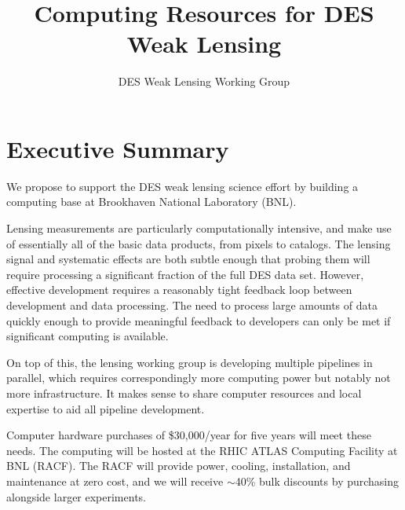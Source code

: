 \documentclass[12pt]{article}
\begin{document}
\title{Computing Resources for DES Weak Lensing}
\author{DES Weak Lensing Working Group}

\date{}
\maketitle


\section{Executive Summary}

We propose to support the DES weak lensing science effort by building a
computing base at Brookhaven National Laboratory (BNL).  

Lensing measurements are particularly computationally intensive, and make use
of essentially all of the basic data products, from pixels to catalogs.  The
lensing signal and systematic effects are both subtle enough that probing them
will require processing a significant fraction of the full DES data set.
However, effective development requires a reasonably tight feedback loop
between development and data processing.  The need to process large amounts
of data quickly enough to provide meaningful feedback to developers 
can only be met if significant computing is available.

On top of this, the lensing working group is developing multiple pipelines in
parallel, which requires correspondingly more computing power but notably not
more infrastructure.  It makes sense to share computer resources and local
expertise to aid all pipeline development.

Computer hardware purchases of \$30,000/year for five years will meet these
needs.  The computing will be hosted at the RHIC ATLAS Computing Facility at
BNL (RACF).  The RACF will provide power, cooling, installation, and
maintenance at zero cost, and we will receive $\sim$40\% bulk discounts by
purchasing alongside larger experiments.
\end{document}
